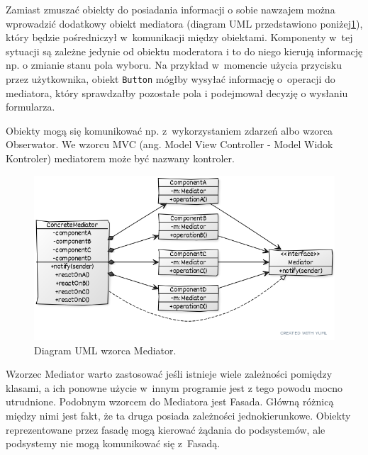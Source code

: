 Zamiast zmuszać obiekty do posiadania informacji o sobie nawzajem można wprowadzić dodatkowy obiekt mediatora (diagram UML przedstawiono poniżej\ref{lab4/fig/MediatorUml}), który będzie pośredniczył w~komunikacji między obiektami. Komponenty w~tej sytuacji są zależne jedynie od obiektu moderatora i to do niego kierują informację np. o zmianie stanu pola wyboru. Na przykład w~momencie użycia przycisku przez użytkownika, obiekt \texttt{Button} mógłby wysyłać informację o~operacji do mediatora, który sprawdzałby pozostałe pola i podejmował decyzję o wysłaniu formularza.


Obiekty mogą się komunikować np. z~wykorzystaniem zdarzeń albo wzorca Obserwator. We wzorcu MVC (ang. Model View Controller - Model Widok Kontroler) mediatorem może być nazwany kontroler.

\begin{figure}[hbt!]
	\centering
	\includegraphics[width=0.9\linewidth]{images/MediatorUml}
	\caption{Diagram UML wzorca Mediator.}
	\label{lab4/fig/MediatorUml}
\end{figure}
%

Wzorzec Mediator warto zastosować jeśli istnieje wiele zależności pomiędzy klasami, a ich ponowne użycie w~innym programie jest z tego powodu mocno utrudnione. Podobnym wzorcem do Mediatora jest Fasada. Główną różnicą między nimi jest fakt, że ta druga posiada zależności jednokierunkowe. Obiekty reprezentowane przez fasadę mogą kierować żądania do podsystemów, ale podsystemy nie mogą komunikować się z~Fasadą.

